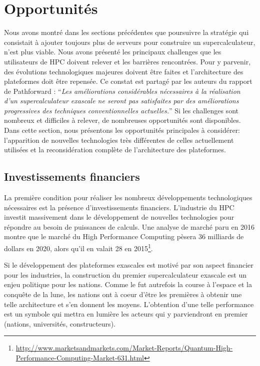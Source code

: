 \section{Opportunités}\label{sec:oppo}
    
    Nous avons montré dans les sections précédentes que poursuivre la stratégie qui consistait à ajouter toujours plus de serveurs pour construire un supercalculateur, n'est plus viable. Nous avons présenté les principaux challenges que les utilisateurs de HPC doivent relever et les barrières rencontrées. Pour y parvenir, des évolutions technologiques majeures doivent être faites et l'architecture des plateformes doit être repensée.
    Ce constat est partagé par les auteurs du rapport de Pathforward \cite{Lucas2014}: ``\textit{Les améliorations considérables nécessaires à la réalisation d'un supercalculateur \gls{exascale} ne seront pas satisfaites par des améliorations progressives des techniques conventionnelles actuelles.}''
    Si les challenges sont nombreux et difficiles à relever, de nombreuses opportunités sont disponibles. Dans cette section, nous présentons les opportunités principales à considérer: l'apparition de nouvelles technologies très différentes de celles actuellement utilisées et la reconsidération complète de l'architecture des plateformes. 


\subsection{Investissements financiers}

    La première condition pour réaliser les nombreux développements technologiques nécessaires est la présence d'investissements financiers. L'industrie du HPC investit massivement dans le développement de nouvelles technologies pour répondre au besoin de puissances de calculs. Une analyse de marché paru en 2016 montre que le marché du High Performance Computing pèsera 36 milliards de dollars en 2020, alors qu'il en valait 28 en 2015\footnote{\url{http://www.marketsandmarkets.com/Market-Reports/Quantum-High-Performance-Computing-Market-631.html}}.

    Si le développement des plateformes exascales est motivé par son aspect financier pour les industries, la construction du premier supercalculateur exascale est un enjeu politique pour les nations. Comme le fut autrefois la course à l'espace et la conquête de la lune, les nations ont à coeur d’être les premières à obtenir une telle architecture et s’en donnent les moyens. L’obtention d’une telle performance est un symbole qui mettra en lumière les acteurs qui y parviendront en premier (nations, universités, constructeurs).

